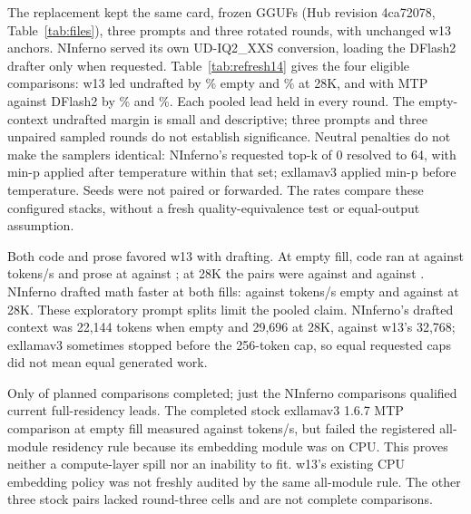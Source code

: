 \documentclass[11pt,letterpaper]{article}
\begin{document}
The replacement kept the same card, frozen GGUFs (Hub revision 4ca72078,
Table~\ref{tab:files}), three prompts and three rotated rounds, with unchanged
w13 anchors. NInferno served its own UD-IQ2\_XXS conversion, loading the
DFlash2 drafter only when requested. Table~\ref{tab:refresh14} gives the four
eligible comparisons: w13 led undrafted by \PeFreshPNifNdZero\% empty and
\PeFreshPNifNdDeep\% at 28K, and with MTP against DFlash2 by
\PeFreshPNifDfZero\% and \PeFreshPNifDfDeep\%. Each pooled lead held in
every round. The empty-context undrafted margin is small and descriptive;
three prompts and three unpaired sampled rounds do not establish significance.
Neutral penalties do not make the samplers identical: NInferno's requested
top-k of 0 resolved to 64, with min-p applied after temperature within that
set; exllamav3 applied min-p before temperature. Seeds were not paired or
forwarded. The rates compare these configured stacks, without a fresh
quality-equivalence test or equal-output assumption.

Both code and prose favored w13 with drafting. At empty fill, code ran at
\PeFreshWNifDfZeroCode{} against \PeFreshNifDfZeroCode{} tokens/s and prose
at \PeFreshWNifDfZeroProse{} against \PeFreshNifDfZeroProse; at 28K the pairs
were \PeFreshWNifDfDeepCode{} against \PeFreshNifDfDeepCode{} and
\PeFreshWNifDfDeepProse{} against \PeFreshNifDfDeepProse. NInferno drafted
math faster at both fills: \PeFreshNifDfZeroMath{} against
\PeFreshWNifDfZeroMath{} tokens/s empty and \PeFreshNifDfDeepMath{} against
\PeFreshWNifDfDeepMath{} at 28K. These exploratory prompt splits limit the
pooled claim. NInferno's drafted context was 22,144 tokens when empty and
29,696 at 28K, against w13's 32,768; exllamav3 sometimes stopped before the
256-token cap, so equal requested caps did not mean equal generated work.

Only \PeFreshComplete{} of \PeFreshPlanned{} planned comparisons completed;
just the \PeFreshEligible{} NInferno comparisons qualified current
full-residency leads. The completed stock exllamav3 1.6.7 MTP comparison at
empty fill measured \PeFreshWStockMtpZero{} against \PeFreshStockMtpZero{}
tokens/s, but failed the registered all-module residency rule because its
embedding module was on CPU. This proves neither a compute-layer spill nor
an inability to fit. w13's existing CPU embedding policy was not freshly
audited by the same all-module rule. The other three stock pairs lacked
round-three cells and are not complete comparisons.
\end{document}
